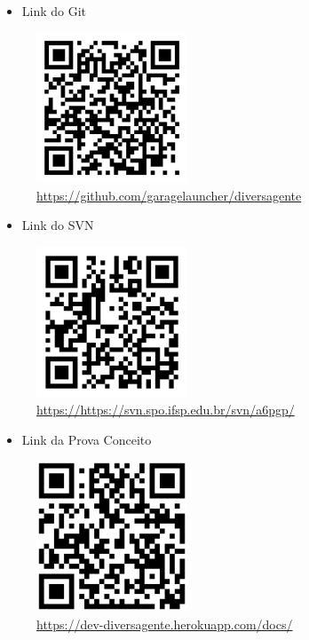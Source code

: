 \begin{itemize}
	\item Link do Git
\end{itemize}
\begin{figure}[htb]
	\includegraphics[width=0.40\textwidth]{anexos/git.png} \\
	\hyperlink {Link do Git}{https://github.com/garagelauncher/diversagente}
\end{figure}

\newline

\begin{itemize}
	\item Link do SVN
\end{itemize}
\begin{figure}[htb]
	\includegraphics[width=0.40\textwidth]{anexos/svn.png} \\
	\hyperlink {Link do SVN}{https://https://svn.spo.ifsp.edu.br/svn/a6pgp/}
\end{figure}

\pagebreak

\begin{itemize}
	\item Link da Prova Conceito
\end{itemize}
\begin{figure}[htb]
	\includegraphics[width=0.40\textwidth]{anexos/prova_de_conceito.png} \\
	\hyperlink {Link da Prova Conceito}{https://dev-diversagente.herokuapp.com/docs/}
\end{figure}

